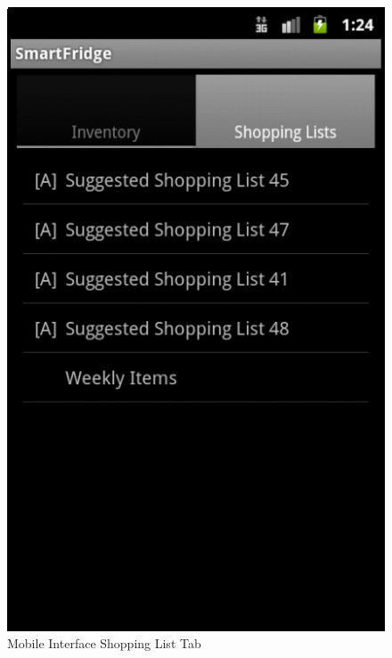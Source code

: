 \documentclass[11pt]{article} %
\begin{document}
\begin{figure}[h!]
\vspace{0.5cm}
\begin{center}
\includegraphics[scale=0.35]{../graphics/mobile_shoppingLists}
\caption{Mobile Interface Shopping List Tab}
\label{mob2}
\end{center}
\end{figure}
\pagebreak
\end{document}
